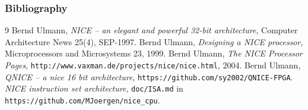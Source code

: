 \documentclass{beamer}
\newcommand{\code}[1]{\texttt{#1}}
\begin{document}
%
 \begin{frame}
  \frametitle{Bibliography}
  {\small
  \begin{thebibliography}{9}
    Bernd Ulmann, \emph{NICE -- an elegant and powerful 32-bit
    architecture}, Computer Architecture News 25(4), SEP-1997.
    Bernd Ulmann, \emph{Designing a NICE processor}, Microprocessors and
    Microsystems 23, 1999.
    Bernd Ulmann, \emph{The NICE Processor Pages},
    \code{http://www.vaxman.de/projects/nice/nice.html}, 2004.
    Bernd Ulmann, \emph{QNICE -- a nice 16 bit architecture},
    \code{https://github.com/sy2002/QNICE-FPGA}.
    \emph{NICE instruction set architecture}, \code{doc/ISA.md} in
    \code{https://github.com/MJoergen/nice\_cpu}.
  \end{thebibliography}
  }
 \end{frame}
\end{document}
